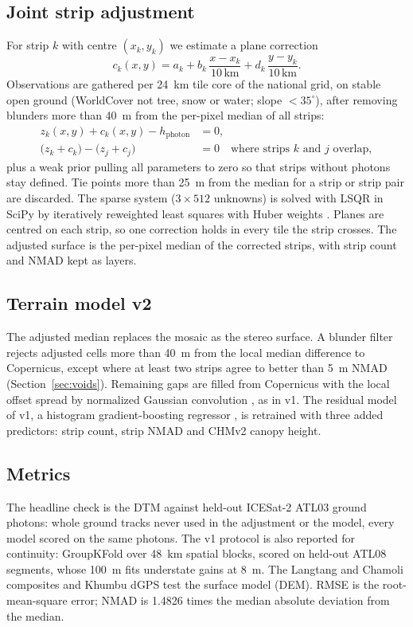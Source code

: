 \documentclass[11pt]{article}
\begin{document}
\subsection{Joint strip adjustment}
For strip $k$ with centre $(x_k, y_k)$ we estimate a plane correction
\begin{equation}
c_k(x,y) = a_k + b_k\,\frac{x-x_k}{10\,\text{km}} + d_k\,\frac{y-y_k}{10\,\text{km}} .
\end{equation}
Observations are gathered per 24~km tile core of the national grid, on stable open ground (WorldCover not tree,
snow or water; slope $<35^\circ$), after removing blunders more than 40~m from the per-pixel median of all strips:
\begin{align}
z_k(x,y) + c_k(x,y) - h_{\text{photon}} &= 0, \\
\bigl(z_k + c_k\bigr) - \bigl(z_j + c_j\bigr) &= 0 \quad \text{where strips $k$ and $j$ overlap},
\end{align}
plus a weak prior pulling all parameters to zero so that strips without photons stay defined.
Tie points more than 25~m from the median for a strip or strip pair are discarded.
The sparse system ($3\times512$ unknowns) is solved with LSQR \citep{paige1982lsqr} in SciPy \citep{virtanen2020scipy}
by iteratively reweighted least squares with Huber weights \citep{huber1964robust}.
Planes are centred on each strip, so one correction holds in every tile the strip crosses.
The adjusted surface is the per-pixel median of the corrected strips, with strip count and NMAD kept as layers.

\subsection{Terrain model v2}
The adjusted median replaces the mosaic as the stereo surface.
A blunder filter rejects adjusted cells more than 40~m from the local median difference to Copernicus, except
where at least two strips agree to better than 5~m NMAD (Section~\ref{sec:voids}).
Remaining gaps are filled from Copernicus with the local offset spread by normalized Gaussian convolution
\citep{knutsson1993normconv}, as in v1.
The residual model of v1, a histogram gradient-boosting regressor \citep{pedregosa2011sklearn,ke2017lightgbm},
is retrained with three added predictors: strip count, strip NMAD and CHMv2 canopy
height.

\subsection{Metrics}
The headline check is the DTM against held-out ICESat-2 ATL03 ground photons: whole ground tracks never used in
the adjustment or the model, every model scored on the same photons.
The v1 protocol is also reported for continuity: GroupKFold over 48~km spatial blocks, scored on held-out ATL08
segments, whose 100~m fits understate gains at 8~m.
The Langtang and Chamoli composites and Khumbu dGPS test the surface model (DEM).
RMSE is the root-mean-square error; NMAD is 1.4826 times the median absolute deviation from the median.
\end{document}
